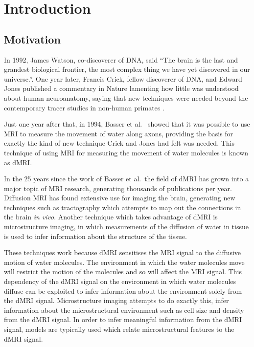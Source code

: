 \chapter{Introduction}
\label{sec:introduction}
\section{Motivation}
\label{sec:intro_motivation}
In 1992, James Watson, co-discoverer of DNA, said ``The brain is the last and grandest biological frontier, the most complex thing we have yet discovered in our universe.''\cite{NAP1785}.
One year later, Francis Crick, fellow discoverer of DNA, and Edward Jones published a commentary in Nature lamenting how little was understood about human neuroanatomy, saying that new techniques were needed beyond the contemporary tracer studies in non-human primates \cite{Crick1993}.

Just one year after that, in 1994, Basser et al.\ \cite{Basser1994} showed that it was possible to use \ac{MRI} to measure the movement of water along axons, providing the basis for exactly the kind of new technique Crick and Jones had felt was needed.
This technique of using \ac{MRI} for measuring the movement of water molecules is known as \ac{dMRI}.

In the 25 years since the work of Basser et al.\ the field of \acl{dMRI} has grown into a major topic of \ac{MRI} research, generating thousands of publications per year.
Diffusion MRI has found extensive use for imaging the brain, generating new techniques such as tractography which attempts to map out the connections in the brain \emph{in vivo}.
Another technique which takes advantage of \ac{dMRI} is microstructure imaging, in which measurements of the diffusion of water in tissue is used to infer information about the structure of the tissue. 

\begin{comment}
\ac{MRI} provides researchers and clinicians a powerful and flexible tool for non-invasively imaging the human body \emph{in vivo} and has found extensive use over the past few decades in furthering the understanding the structure and function of the human brain.
One technique which is commonly employed to study the structure of the human brain is \ac{dMRI}.
\end{comment}

These techniques work because \ac{dMRI} sensitises the \ac{MRI} signal to the diffusive motion of water molecules.
The environment in which the water molecules move will restrict the motion of the molecules and so will affect the \ac{MRI} signal. 
This dependency of the \ac{dMRI} signal on the environment in which water molecules diffuse can be exploited to infer information about the environment solely from the \ac{dMRI} signal.  
Microstructure imaging attempts to do exactly this, infer information about the microstructural environment such as cell size and density from the \ac{dMRI} signal.
In order to infer meaningful information from the \ac{dMRI} signal, models are typically used which relate microstructural features to the \ac{dMRI} signal.

